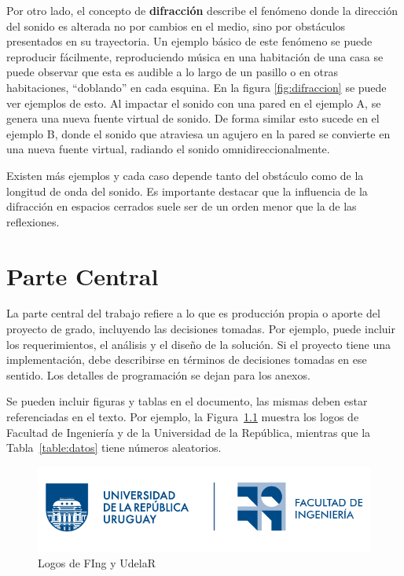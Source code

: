 \documentclass{prgrado}
\begin{document}
Por otro lado, el concepto de \textbf{difracción} describe el fenómeno donde la dirección del sonido es alterada no por cambios en el medio, sino por obstáculos presentados en su trayectoria. Un ejemplo básico de este fenómeno se puede reproducir fácilmente, reproduciendo música en una habitación de una casa se puede observar que esta es audible a lo largo de un pasillo o en otras habitaciones, “doblando” en cada esquina. En la figura \ref{fig:difraccion} se puede ver ejemplos de esto. Al impactar el sonido con una pared en el ejemplo A, se genera una nueva fuente virtual de sonido. De forma similar esto sucede en el ejemplo B, donde el sonido que atraviesa un agujero en la pared se convierte en una nueva fuente virtual, radiando el sonido omnidireccionalmente.

Existen más ejemplos y cada caso depende tanto del obstáculo como de la longitud de onda del sonido. Es importante destacar que la influencia de la difracción en espacios cerrados suele ser de un orden menor que la de las reflexiones.

\chapter{Parte Central}
La parte central del trabajo refiere a lo que es producción propia o aporte del
proyecto de grado, incluyendo las decisiones tomadas. Por ejemplo, puede incluir
los requerimientos, el análisis y el diseño de la solución. Si el proyecto tiene una
implementación, debe describirse en términos de decisiones tomadas en ese sentido.
Los detalles de programación se dejan para los anexos.

Se pueden incluir figuras y tablas en el documento, las mismas deben estar referenciadas en el texto. Por ejemplo, la Figura~\ref{fig:logos} muestra los logos de Facultad de Ingeniería y de la Universidad de la República, mientras que la Tabla~\ref{table:datos} tiene números aleatorios.

\begin{figure}[h!]
    \centering
    \includegraphics[width=\textwidth]{figs/logo-udelar-fing.png}
    \caption{Logos de FIng y UdelaR}
    \label{fig:logos}
\end{figure}
\end{document}
